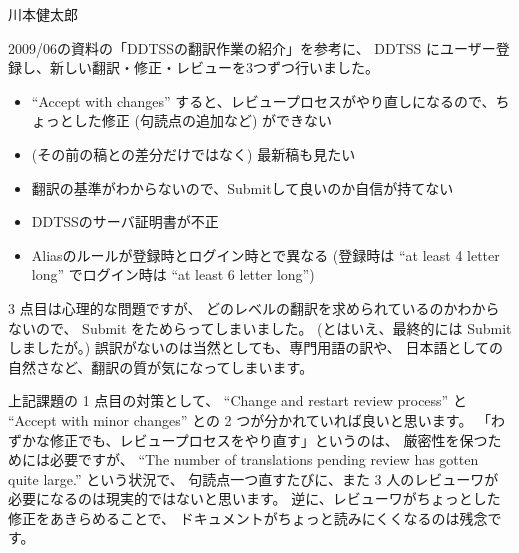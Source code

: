 
\begin{prework}{川本健太郎}

2009/06の資料の「DDTSSの翻訳作業の紹介」を参考に、
DDTSS にユーザー登録し、新しい翻訳・修正・レビューを3つずつ行いました。



\begin{itemize}
 \item ``Accept with changes'' すると、レビュープロセスがやり直しになるので、ちょっとした修正 (句読点の追加など) ができない
 \item (その前の稿との差分だけではなく) 最新稿も見たい
 \item 翻訳の基準がわからないので、Submitして良いのか自信が持てない
 \item DDTSSのサーバ証明書が不正
 \item Aliasのルールが登録時とログイン時とで異なる (登録時は ``at least 4 letter long'' でログイン時は ``at least 6 letter long'')
\end{itemize}

3 点目は心理的な問題ですが、
どのレベルの翻訳を求められているのかわからないので、
Submit をためらってしまいました。
(とはいえ、最終的には Submit しましたが。)
誤訳がないのは当然としても、専門用語の訳や、
日本語としての自然さなど、翻訳の質が気になってしまいます。


上記課題の 1 点目の対策として、
``Change and restart review process'' と ``Accept with minor changes'' との
2 つが分かれていれば良いと思います。
「わずかな修正でも、レビュープロセスをやり直す」というのは、
厳密性を保つためには必要ですが、
``The number of translations pending review has gotten quite large.'' という状況で、
句読点一つ直すたびに、また 3 人のレビューワが必要になるのは現実的ではないと思います。
逆に、レビューワがちょっとした修正をあきらめることで、
ドキュメントがちょっと読みにくくなるのは残念です。


\end{prework}

